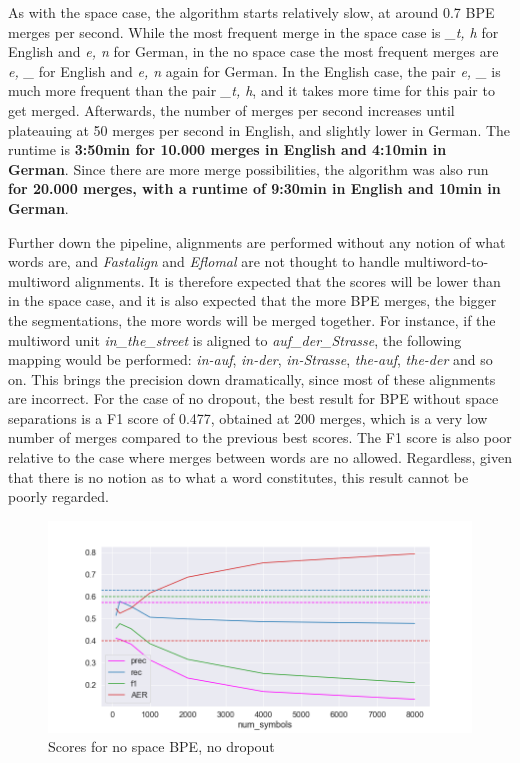 As with the space case, the algorithm starts relatively slow, at around 0.7 BPE merges per second. While the most frequent merge in the space case is \emph{\_t, h} for English and \emph{e, n} for German, in the no space case the most frequent merges are \emph{e, \_} for English and \emph{e, n} again for German. In the English case, the pair \emph{e, \_} is much more frequent than the pair \emph{\_t, h}, and it takes more time for this pair to get merged. Afterwards, the number of merges per second increases until plateauing at 50 merges per second in English, and slightly lower in German. The runtime is \textbf{3:50min for 10.000 merges in English and 4:10min in German}. Since there are more merge possibilities, the algorithm was also run \textbf{for 20.000 merges, with a runtime of 9:30min in English and 10min in German}.

Further down the pipeline, alignments are performed without any notion of what words are, and \emph{Fastalign} and \emph{Eflomal} are not thought to handle multiword-to-multiword alignments. It is therefore expected that the scores will be lower than in the space case, and it is also expected that the more BPE merges, the bigger the segmentations, the more words will be merged together. For instance, if the multiword unit \emph{in\_the\_street} is aligned to \emph{auf\_der\_Strasse}, the following mapping would be performed: \emph{in-auf}, \emph{in-der}, \emph{in-Strasse}, \emph{the-auf}, \emph{the-der} and so on. This brings the precision down dramatically, since most of these alignments are incorrect. For the case of no dropout, the best result for BPE without space separations is a F1 score of 0.477, obtained at 200 merges, which is a very low number of merges compared to the previous best scores. The F1 score is also poor relative to the case where merges between words are no allowed. Regardless, given that there is no notion as to what a word constitutes, this result cannot be poorly regarded.

\begin{figure}[!ht]
    \centering
    \includegraphics[width=12cm]{../reports/scores_normal_bpe/eng_deu_ns_fastalign.png}
    \caption{Scores for no space BPE, no dropout}
\end{figure}

